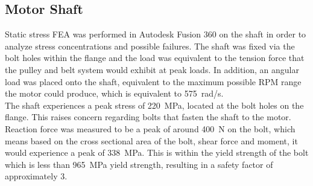 \documentclass[main.tex]{subfiles}
\begin{document}
    \subsection{Motor Shaft}
    
    Static stress FEA was performed in Autodesk Fusion 360 on the shaft in order to analyze stress concentrations and possible failures. The shaft was fixed via the bolt holes within the flange and the load was equivalent to the tension force that the pulley and belt system would exhibit at peak loads. In addition, an angular load was placed onto the shaft, equivalent to the maximum possible RPM range the motor could produce, which is equivalent to \SI{575}{rad/s}.\\

    The shaft experiences a peak stress of \SI{220}{MPa}, located at the bolt holes on the flange. This raises concern regarding bolts that fasten the shaft to the motor. Reaction force was measured to be a peak of around \SI{400}{N} on the bolt, which means based on the cross sectional area of the bolt, shear force and moment, it would experience a peak of \SI{338}{MPa}. This is within the yield strength of the bolt which is less than \SI{965}{MPa} yield strength, resulting in a safety factor of approximately 3.\\
\end{document}
